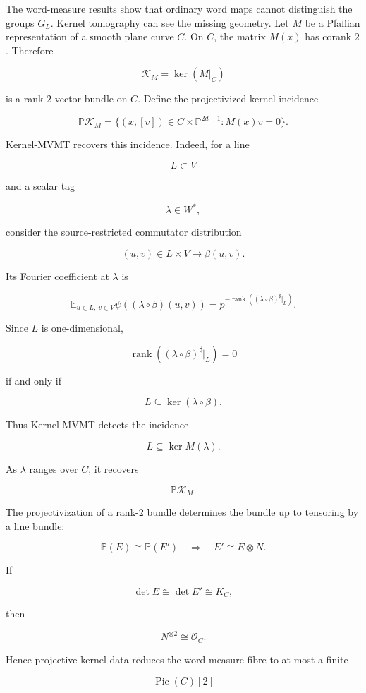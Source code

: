 \documentclass[11pt]{article}
\begin{document}
The word-measure results show that ordinary word maps cannot distinguish the groups $G_L$. Kernel tomography can see the missing geometry. Let $M$ be a Pfaffian representation of a smooth plane curve $C$. On $C$, the matrix $M(x)$ has corank $2$. Therefore

\[
\mathcal K_M=\ker(M|_C)
\]

is a rank-$2$ vector bundle on $C$. Define the projectivized kernel incidence

\[
\mathbb P\mathcal K_M
=\{(x,[v])\in C\times\mathbb P^{2d-1}:M(x)v=0\}.
\]

Kernel-MVMT recovers this incidence. Indeed, for a line

\[
L\subset V
\]

and a scalar tag

\[
\lambda\in W^*,
\]

consider the source-restricted commutator distribution

\[
(u,v)\in L\times V
\longmapsto
\beta(u,v).
\]

Its Fourier coefficient at $\lambda$ is

\[
\mathbb E_{u\in L,\ v\in V}
\psi((\lambda\circ\beta)(u,v))
=p^{-\operatorname{rank}((\lambda\circ\beta)^\sharp|_L)}.
\]

Since $L$ is one-dimensional,

\[
\operatorname{rank}((\lambda\circ\beta)^\sharp|_L)=0
\]

if and only if

\[
L\subseteq\ker(\lambda\circ\beta).
\]

Thus Kernel-MVMT detects the incidence

\[
L\subseteq\ker M(\lambda).
\]

As $\lambda$ ranges over $C$, it recovers

\[
\mathbb P\mathcal K_M.
\]

The projectivization of a rank-$2$ bundle determines the bundle up to tensoring by a line bundle:

\[
\mathbb P(E)\cong\mathbb P(E')
\quad\Rightarrow\quad
E'\cong E\otimes N.
\]

If

\[
\det E\cong\det E'\cong K_C,
\]

then

\[
N^{\otimes2}\cong\mathcal O_C.
\]

Hence projective kernel data reduces the word-measure fibre to at most a finite

\[
\operatorname{Pic}(C)[2]
\]
\end{document}
